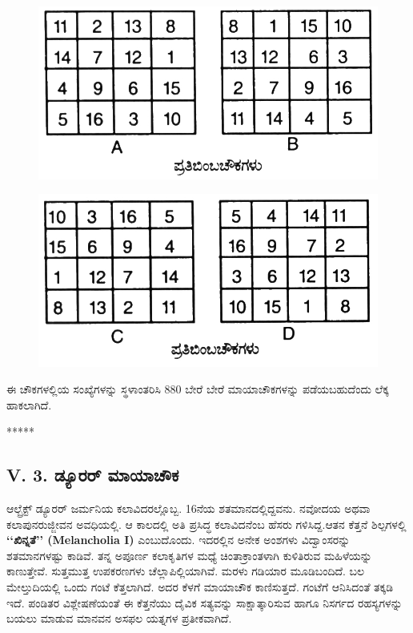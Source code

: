 \begin{figure}[H]
\includegraphics{src/figures/chap4/fig4-13.jpg}
\end{figure}
\begin{figure}[H]
\includegraphics{src/figures/chap4/fig4-14.jpg}
\end{figure}

ಈ ಚೌಕಗಳಲ್ಲಿಯ ಸಂಖ್ಯೆಗಳನ್ನು ಸ್ಥಳಾಂತರಿಸಿ 880 ಬೇರೆ ಬೇರೆ ಮಾಯಾಚೌಕಗಳನ್ನು ಪಡೆಯಬಹುದೆಂದು ಲೆಕ್ಕ ಹಾಕಲಾಗಿದೆ.
\begin{center}
*****
\end{center}

\subsection*{V. 3. ಡ್ಯೂರರ್ ಮಾಯಾಚೌಕ}

ಆಲ್ಬ್ರೆಕ್ಟ್ ಡ್ಯೂರರ್ ಜರ್ಮನಿಯ ಕಲಾವಿದರಲ್ಲೊಬ್ಬ. 16ನೆಯ ಶತಮಾನದಲ್ಲಿದ್ದವನು. ನವೋದಯ ಅಥವಾ ಕಲಾಪುನರುಜ್ಜೀವನ ಅವಧಿಯಲ್ಲಿ. ಆ ಕಾಲದಲ್ಲಿ ಅತಿ ಪ್ರಸಿದ್ಧ ಕಲಾವಿದನೆಂಬ ಹೆಸರು ಗಳಿಸಿದ್ದ.ಆತನ ಕೆತ್ತನೆ ಶಿಲ್ಪಗಳಲ್ಲಿ \textbf{‘‘ಖಿನ್ನತೆ’’ (Melancholia I)} ಎಂಬುದೊಂದು. ಇದರಲ್ಲಿನ ಅನೇಕ ಅಂಶಗಳು ವಿದ್ವಾಂಸರನ್ನು ಶತಮಾನಗಳಷ್ಟು ಕಾಡಿವೆ. ತನ್ನ ಅಪೂರ್ಣ ಕಲಾಕೃತಿಗಳ ಮಧ್ಯೆ ಚಿಂತಾಕ್ರಾಂತಳಾಗಿ ಕುಳಿತಿರುವ ಮಹಿಳೆಯನ್ನು ಕಾಣುತ್ತೇವೆ. ಸುತ್ತಮುತ್ತ ಉಪಕರಣಗಳು ಚೆಲ್ಲಾಪಿಲ್ಲಿಯಾಗಿವೆ. ಮರಳು ಗಡಿಯಾರ ಮೂಡಿಬಂದಿದೆ. ಬಲ ಮೇಲ್ತುದಿಯಲ್ಲಿ ಒಂದು ಗಂಟೆ ಕೆತ್ತಲಾಗಿದೆ. ಅದರ ಕೆಳಗೆ ಮಾಯಾಚೌಕ ಕಾಣಿಸುತ್ತದೆ. ಗಂಟೆಗೆ ಆನಿಸಿದಂತೆ ತಕ್ಕಡಿ ಇದೆ. ಪಂಡಿತರ ವಿಶ್ಲೇಷಣೆಯಂತೆ ಈ ಕೆತ್ತನೆಯು ದೈವಿಕ ಸತ್ಯವನ್ನು ಸಾಕ್ಷಾತ್ಕಾರಿಸುವ ಹಾಗೂ ನಿಸರ್ಗದ ರಹಸ್ಯಗಳನ್ನು ಬಯಲು ಮಾಡುವ ಮಾನವನ ಅಸಫಲ ಯತ್ನಗಳ ಪ್ರತೀಕವಾಗಿದೆ.

